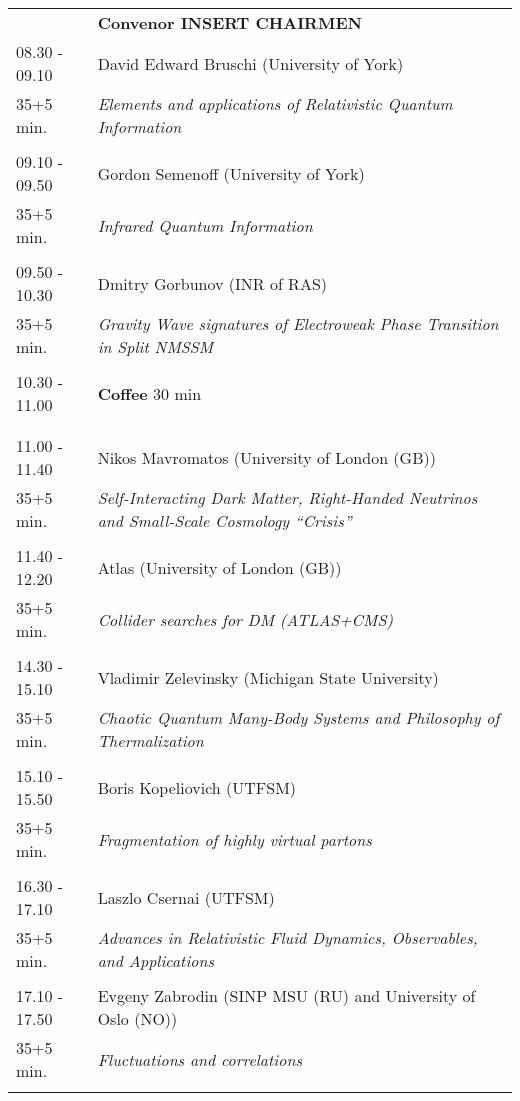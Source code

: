 \begin{longtable}{p{3cm}p{13cm}}
&\hfill {\bf Convenor INSERT CHAIRMEN }\\ 
08.30 - 09.10 & David Edward Bruschi (University of York)\\ 
35+5 min. & {\it Elements and applications of Relativistic Quantum Information}\\ 
 & \\ 
09.10 - 09.50 & Gordon Semenoff (University of York)\\ 
35+5 min. & {\it Infrared Quantum Information}\\ 
 & \\ 
09.50 - 10.30 & Dmitry Gorbunov (INR of RAS)\\ 
35+5 min. & {\it Gravity Wave signatures of Electroweak Phase Transition in Split NMSSM}\\ 
 & \\ 
10.30 - 11.00 & {\bf Coffee} \hfill 30 min \\ 
 & \\ 
 & \\ 
11.00 - 11.40 & Nikos Mavromatos (University of London (GB))\\ 
35+5 min. & {\it Self-Interacting Dark Matter, Right-Handed Neutrinos and Small-Scale Cosmology ``Crisis''}\\ 
 & \\ 
11.40 - 12.20 & Atlas (University of London (GB))\\ 
35+5 min. & {\it Collider searches for DM (ATLAS+CMS)}\\ 
 & \\ 
14.30 - 15.10 & Vladimir Zelevinsky (Michigan State University)\\ 
35+5 min. & {\it Chaotic Quantum Many-Body Systems and Philosophy of Thermalization}\\ 
 & \\ 
15.10 - 15.50 & Boris Kopeliovich (UTFSM)\\ 
35+5 min. & {\it Fragmentation of highly virtual partons}\\ 
 & \\ 
16.30 - 17.10 & Laszlo Csernai (UTFSM)\\ 
35+5 min. & {\it Advances in Relativistic Fluid Dynamics, Observables, and Applications}\\ 
 & \\ 
17.10 - 17.50 & Evgeny Zabrodin (SINP MSU (RU) and University of Oslo (NO))\\ 
35+5 min. & {\it Fluctuations and correlations}\\ 
 & \\ 
\end{longtable}

